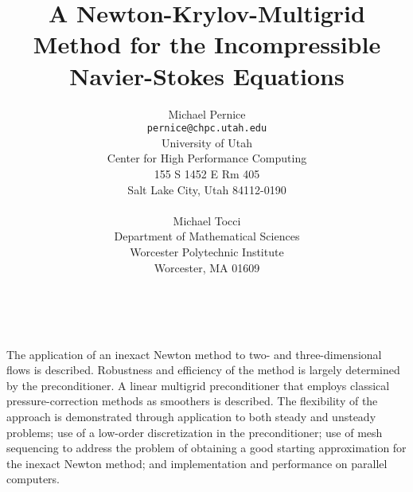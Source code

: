 \documentclass[11pt]{article}
\date{ ~ \hspace{-4mm}}
\title{A Newton-Krylov-Multigrid Method for the Incompressible Navier-Stokes Equations  }
\author{Michael Pernice \\ {\tt  pernice@chpc.utah.edu} \\ University of Utah \\ Center for High Performance Computing \\ 155 S 1452 E Rm 405 \\ Salt Lake City, Utah  84112-0190  \\ \\ Michael Tocci \\ Department of Mathematical Sciences  \\ Worcester Polytechnic Institute  \\ Worcester, MA 01609}
\begin{document}
\maketitle
\thispagestyle{empty}





 


 

The application of an inexact Newton method to two- and
three-dimensional flows is described.  Robustness and efficiency of
the method is largely determined by the preconditioner.  A linear
multigrid preconditioner that employs classical pressure-correction
methods as smoothers is described.  The flexibility of the approach is
demonstrated through application to both steady and unsteady problems;
use of a low-order discretization in the preconditioner; use of
mesh sequencing to address the problem of obtaining a good starting
approximation for the inexact Newton method; and implementation and
performance on parallel computers.
\end{document}
